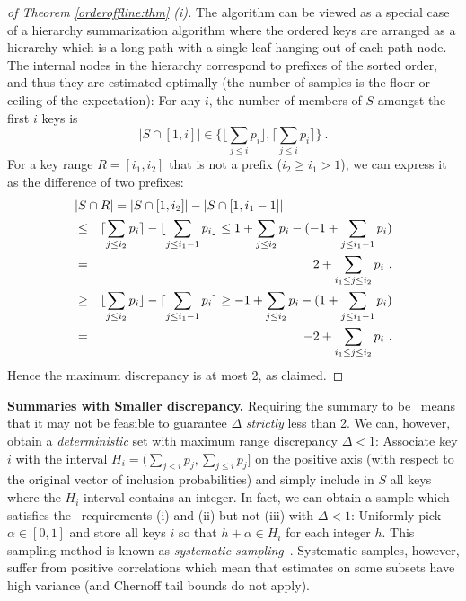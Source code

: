 \documentclass[11pt]{article}
\begin{document}
\begin{proof}[of Theorem \ref{orderoffline:thm} (i)]
The algorithm can be viewed as a special case of a hierarchy summarization
algorithm where the ordered keys are arranged as a  
hierarchy which is a long path with a single leaf hanging out of each
path node.   
The internal nodes in the hierarchy correspond to prefixes of the
sorted order, and thus they are estimated optimally
(the number of samples is the floor or ceiling of the expectation):
For any $i$, 
the number of members of $S$ amongst the first $i$ keys is
$$|S\cap[1,i]|\in \{\lfloor \sum_{j\leq i} p_i \rfloor,\lceil
\sum_{j\leq i} p_i \rceil\}\ .$$ 
For a key range $R=[i_1,i_2]$ that is not a prefix ($i_2\geq i_1>1$),
we can express it as the difference of two prefixes:
{\small
\begin{eqnarray*}
\lefteqn{|S\cap R| = |S\cap [1,i_2]| - |S\cap [1,i_1-1]|}\\
& \leq & \lceil \sum_{j\leq i_2} p_i \rceil - \lfloor \sum_{j\leq i_1-1} p_i \rfloor \leq 1+\sum_{j\leq i_2} p_i - (-1+ \sum_{j\leq i_1-1} p_i) \\
& = & 2+\sum_{i_1\leq j \leq i_2}p_i\ .\\
 & \geq & \lfloor \sum_{j\leq i_2} p_i \rfloor - \lceil \sum_{j\leq i_1-1} p_i \rceil \geq -1+\sum_{j\leq i_2} p_i - (1+ \sum_{j\leq i_1-1} p_i) \\
 & =  & -2+\sum_{i_1\leq j \leq i_2}p_i\ .
\end{eqnarray*}}
\noindent
Hence the maximum discrepancy is at most 2, as claimed. 
\end{proof}

\noindent
{\bf Summaries with Smaller discrepancy.}
  Requiring the summary to be \varopt\ means that it may not be
feasible to guarantee $\Delta$ {\em strictly} less than 2. 
We can, however, obtain a {\em deterministic} set with maximum range 
discrepancy $\Delta < 1$:
 Associate key $i$ with the
interval $H_i=(\sum_{j< i} p_j, \sum_{j\leq i} p_j]$ on the positive axis (with respect to the original vector of inclusion probabilities) and simply 
include in $S$ all keys where the $H_i$ interval contains an integer.
In fact, we can obtain a sample which satisfies the
\varopt\ requirements (i) and (ii) but not (iii) with $\Delta < 1$:
Uniformly pick $\alpha\in [0,1]$
and store all keys $i$ so that $h+\alpha \in H_i$ for each integer $h$.
 This sampling method is known as {\em systematic sampling}~\cite{SSW92}. 
Systematic samples, however, suffer from positive correlations which mean
that estimates on some subsets have high variance (and Chernoff tail
bounds do not apply). 
\end{document}
